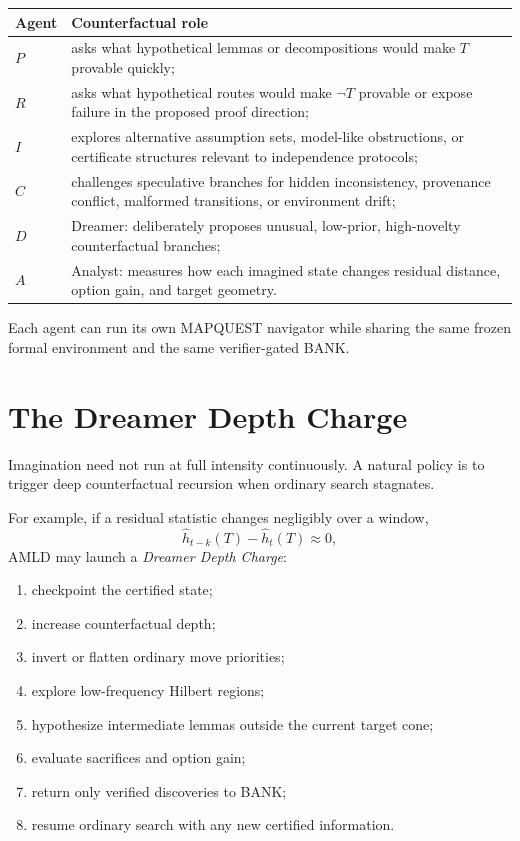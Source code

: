 \documentclass[11pt]{article}
\begin{document}
\begin{center}
\begin{tabular}{>{\centering\arraybackslash}p{} p{}}
\toprule
Agent & Counterfactual role \\
\midrule
$P$ & asks what hypothetical lemmas or decompositions would make $T$ provable quickly; \\
$R$ & asks what hypothetical routes would make $\neg T$ provable or expose failure in the proposed proof direction; \\
$I$ & explores alternative assumption sets, model-like obstructions, or certificate structures relevant to independence protocols; \\
$C$ & challenges speculative branches for hidden inconsistency, provenance conflict, malformed transitions, or environment drift; \\
$D$ & Dreamer: deliberately proposes unusual, low-prior, high-novelty counterfactual branches; \\
$A$ & Analyst: measures how each imagined state changes residual distance, option gain, and target geometry. \\
\bottomrule
\end{tabular}
\end{center}

Each agent can run its own MAPQUEST navigator while sharing the same frozen formal environment and the same verifier-gated BANK.

\section{The Dreamer Depth Charge}

Imagination need not run at full intensity continuously. A natural policy is to trigger deep counterfactual recursion when ordinary search stagnates.

For example, if a residual statistic changes negligibly over a window,
\[
\widehat h_{t-k}(T)-\widehat h_t(T)\approx 0,
\]
AMLD may launch a \emph{Dreamer Depth Charge}:
\begin{enumerate}[label=(\alph*)]
\item checkpoint the certified state;
\item increase counterfactual depth;
\item invert or flatten ordinary move priorities;
\item explore low-frequency Hilbert regions;
\item hypothesize intermediate lemmas outside the current target cone;
\item evaluate sacrifices and option gain;
\item return only verified discoveries to BANK;
\item resume ordinary search with any new certified information.
\end{enumerate}
\end{document}
